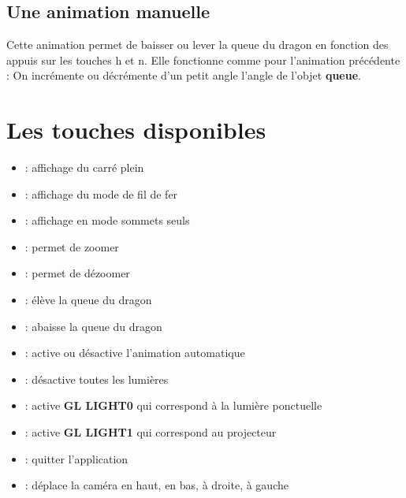\documentclass{article}
\begin{document}
\subsection{Une animation manuelle}

Cette animation permet de baisser ou lever la queue du dragon en fonction des appuis sur les touches h et n. Elle fonctionne comme pour l'animation précédente : On incrémente ou décrémente d'un petit angle l'angle de l'objet \textbf{queue}.


\section{Les touches disponibles}

\begin{itemize}
\item {} : affichage du carré plein
\item {} : affichage du mode de fil de fer
\item {} : affichage en mode sommets seuls
\item {} : permet de zoomer
\item {} : permet de dézoomer 
\item {} : élève la queue du dragon
\item {} : abaisse la queue du dragon
\item {} : active ou désactive l'animation automatique 
\item {} : désactive toutes les lumières 
\item {} : active \textbf{GL LIGHT0} qui correspond à la lumière ponctuelle
\item {} : active \textbf{GL LIGHT1} qui correspond au projecteur
\item {} : quitter l'application 
\item \UArrow \DArrow \LArrow \RArrow : déplace la caméra en haut, en bas, à droite, à gauche
\end{itemize}

\end{document}
